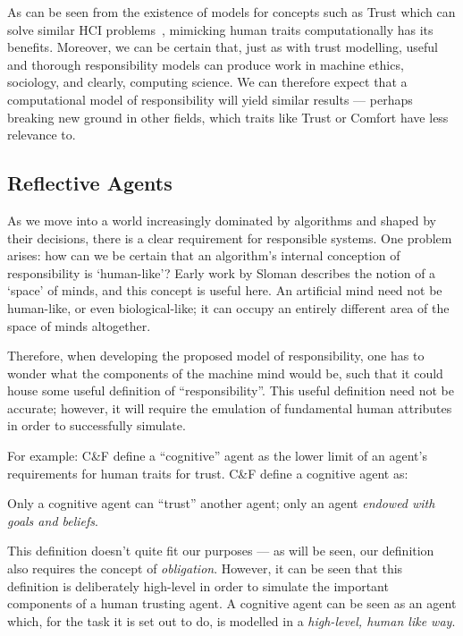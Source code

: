 As can be seen from the existence of models for concepts such as Trust which can solve similar HCI problems~\cite{designing_with_trust}, mimicking human traits computationally has its benefits. Moreover, we can be certain that, just as with trust modelling, useful and thorough responsibility models can produce work in machine ethics\cite{Moor2006}, sociology\cite{Macy2002}, and clearly, computing science. We can therefore expect that a computational model of responsibility will yield similar results --- perhaps breaking new ground in other fields, which traits like Trust or Comfort have less relevance to.\par

\subsection{Reflective Agents}

As we move into a world increasingly dominated by algorithms and shaped by their decisions, there is a clear requirement for responsible systems. One problem arises: how can we be certain that an algorithm's internal conception of responsibility is `human-like'? Early work by Sloman describes the notion of a `space' of minds\cite{Sloman1984TheMinds}, and this concept is useful here. An artificial mind need not be human-like, or even biological-like; it can occupy an entirely different area of the space of minds altogether. \par

Therefore, when developing the proposed model of responsibility, one has to wonder what the components of the machine mind would be, such that it could house some useful definition of ``responsibility''. This useful definition need not be accurate; however, it will require the emulation of fundamental human attributes in order to successfully simulate.\par

For example: C\&F define a ``cognitive'' agent as the lower limit of an agent's requirements for human traits for trust. C\&F define a cognitive agent as:
\begin{displayquote}
    Only a cognitive agent can ``trust'' another agent; only an agent \emph{endowed with goals and beliefs}.
\end{displayquote}\par

This definition doesn't quite fit our purposes --- as will be seen, our definition also requires the concept of \emph{obligation}. However, it can be seen that this definition is deliberately high-level in order to simulate the important components of a human trusting agent. A cognitive agent can be seen as an agent which, for the task it is set out to do, is modelled in a \emph{high-level, human like way}. \par

